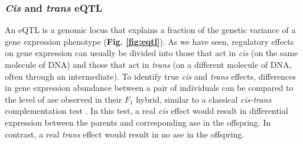 \subsubsection{\textit{Cis} and \textit{trans} eQTL}

An eQTL is a genomic locus that explains a fraction of the genetic variance of a gene expression phenotype (\textbf{Fig. \ref{fig:eqtl}}). 
As we have seen, regulatory effects on gene expression can usually be divided into those that act in \textit{cis} (on the same molecule of DNA) and those that act in \textit{trans} (on a different molecule of DNA, often through an intermediate).
To identify true \textit{cis} and \textit{trans} effects, differences in gene expression abundance between a pair of individuals can be compared to the level of \gls{ase} observed in their $F_1$ hybrid, similar to a classical \textit{cis-trans} complementation test \cite{mcmanus2010regulatory, goncalves2012extensive}. 
In this test, a real \textit{cis} effect would result in differential expression between the parents and corresponding \gls{ase} in the offspring. 
In contrast, a real \textit{trans} effect would result in no \gls{ase} in the offspring. \\

